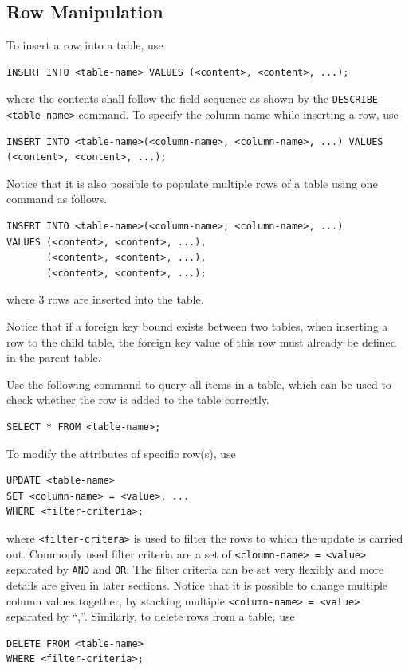 \subsection{Row Manipulation}

To insert a row into a table, use
\begin{lstlisting}
INSERT INTO <table-name> VALUES (<content>, <content>, ...);
\end{lstlisting}
where the contents shall follow the field sequence as shown by the \verb|DESCRIBE <table-name>| command. To specify the column name while inserting a row, use
\begin{lstlisting}
INSERT INTO <table-name>(<column-name>, <column-name>, ...) VALUES (<content>, <content>, ...);
\end{lstlisting}
Notice that it is also possible to populate multiple rows of a table using one command as follows.
\begin{lstlisting}
INSERT INTO <table-name>(<column-name>, <column-name>, ...)
VALUES (<content>, <content>, ...),
       (<content>, <content>, ...),
       (<content>, <content>, ...);
\end{lstlisting}
where 3 rows are inserted into the table.

Notice that if a foreign key bound exists between two tables, when inserting a row to the child table, the foreign key value of this row must already be defined in the parent table.

Use the following command to query all items in a table, which can be used to check whether the row is added to the table correctly.
\begin{lstlisting}
SELECT * FROM <table-name>;
\end{lstlisting}

To modify the attributes of specific row(s), use
\begin{lstlisting}
UPDATE <table-name>
SET <column-name> = <value>, ...
WHERE <filter-criteria>;
\end{lstlisting}
where \verb|<filter-critera>| is used to filter the rows to which the update is carried out. Commonly used filter criteria are a set of \verb|<cloumn-name> = <value>| separated by \verb|AND| and \verb|OR|. The filter criteria can be set very flexibly and more details are given in later sections. Notice that it is possible to change multiple column values together, by stacking multiple \verb|<column-name> = <value>| separated by ``,''. Similarly, to delete rows from a table, use
\begin{lstlisting}
DELETE FROM <table-name>
WHERE <filter-criteria>;
\end{lstlisting}

